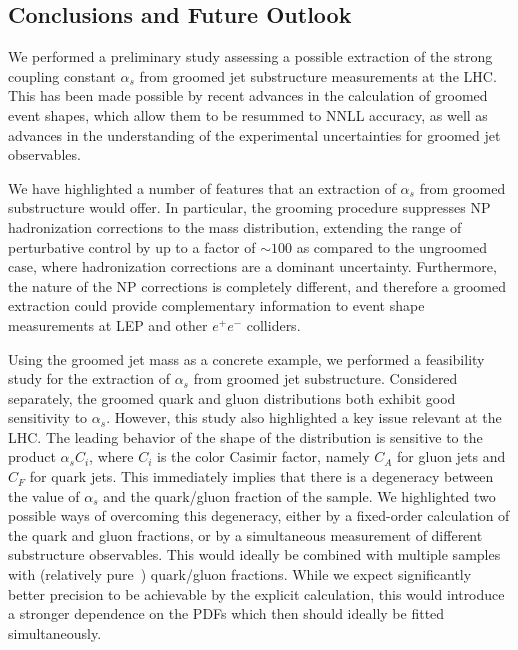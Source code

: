 \documentclass[11pt]{cernrep}
\begin{document}
\subsection{Conclusions and Future Outlook}
\label{jetsub_alphas_sec:future}

We performed a preliminary study assessing a possible extraction of the strong coupling constant $\alpha_s$ from groomed jet substructure measurements at the LHC.
%
This has been made possible by recent advances in the calculation of groomed event shapes, which allow them to be resummed to NNLL accuracy, as well as advances in the understanding of the experimental uncertainties for groomed jet observables.
 
We have highlighted a number of features that an extraction of $\alpha_s$ from groomed substructure would offer.
%
In particular, the grooming procedure suppresses NP hadronization corrections to the mass distribution, extending the range of perturbative control by up to a factor of $\sim 100$ as compared to the ungroomed case, where hadronization corrections are a dominant uncertainty.
%
Furthermore, the nature of the NP corrections is completely different, and therefore a groomed extraction could provide complementary information to event shape measurements at LEP and other $e^+e^-$ colliders. 

Using the groomed jet mass as a concrete example, we performed a feasibility study for the extraction of $\alpha_s$ from groomed jet substructure.
%
Considered separately, the groomed quark and gluon distributions both exhibit good sensitivity to $\alpha_s$.
%
However, this study also highlighted a key issue relevant at the LHC.
%
The leading behavior of the shape of the distribution is sensitive to the product $\alpha_s C_i$, where $C_i$ is the color Casimir factor, namely $C_A$ for gluon jets and $C_F$ for quark jets.
%
This immediately implies that there is a degeneracy between the value of $\alpha_s$ and the quark/gluon fraction of the sample.
%
We highlighted two possible ways of overcoming this degeneracy, either by a fixed-order calculation of the quark and gluon fractions, or by a simultaneous measurement of different substructure observables.
%
This would ideally be combined with multiple samples with (relatively pure~\cite{Gallicchio:2011xc}) quark/gluon fractions.
%
While we expect significantly better precision to be achievable by the explicit calculation, this would introduce a stronger dependence on the PDFs which then should ideally be fitted simultaneously.
\end{document}
